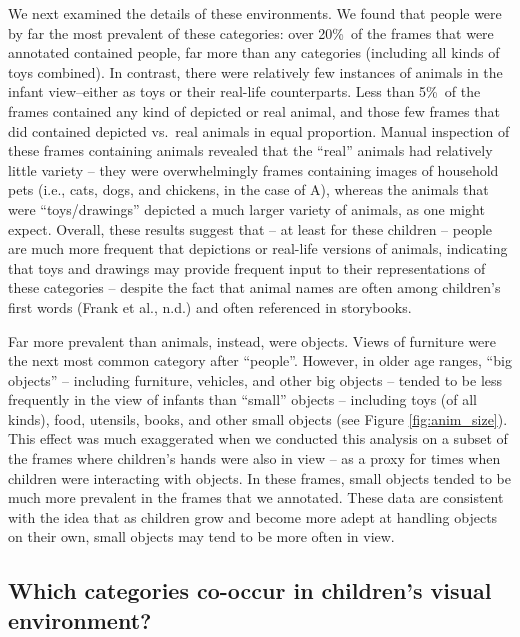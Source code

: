 \documentclass[10pt, letterpaper]{article}
\begin{document}
We next examined the details of these environments. We found that people
were by far the most prevalent of these categories: over 20\%~of the
frames that were annotated contained people, far more than any
categories (including all kinds of toys combined). In contrast, there
were relatively few instances of animals in the infant view--either as
toys or their real-life counterparts. Less than 5\%~of the frames
contained any kind of depicted or real animal, and those few frames that
did contained depicted vs.~real animals in equal proportion. Manual
inspection of these frames containing animals revealed that the ``real''
animals had relatively little variety -- they were overwhelmingly frames
containing images of household pets (i.e., cats, dogs, and chickens, in
the case of A), whereas the animals that were ``toys/drawings'' depicted
a much larger variety of animals, as one might expect. Overall, these
results suggest that -- at least for these children -- people are much
more frequent that depictions or real-life versions of animals,
indicating that toys and drawings may provide frequent input to their
representations of these categories -- despite the fact that animal
names are often among children's first words (Frank et al., n.d.) and
often referenced in storybooks.

Far more prevalent than animals, instead, were objects. Views of
furniture were the next most common category after ``people''. However,
in older age ranges, ``big objects'' -- including furniture, vehicles,
and other big objects -- tended to be less frequently in the view of
infants than ``small'' objects -- including toys (of all kinds), food,
utensils, books, and other small objects (see Figure
\ref{fig:anim_size}). This effect was much exaggerated when we conducted
this analysis on a subset of the frames where children's hands were also
in view -- as a proxy for times when children were interacting with
objects. In these frames, small objects tended to be much more prevalent
in the frames that we annotated. These data are consistent with the idea
that as children grow and become more adept at handling objects on their
own, small objects may tend to be more often in view.

\hypertarget{which-categories-co-occur-in-childrens-visual-environment}{%
\subsection{Which categories co-occur in children's visual
environment?}\label{which-categories-co-occur-in-childrens-visual-environment}}
\end{document}
